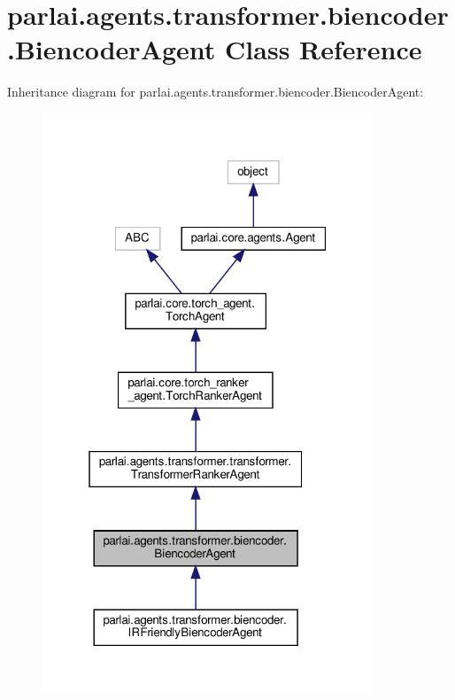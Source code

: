 \hypertarget{classparlai_1_1agents_1_1transformer_1_1biencoder_1_1BiencoderAgent}{}\section{parlai.\+agents.\+transformer.\+biencoder.\+Biencoder\+Agent Class Reference}
\label{classparlai_1_1agents_1_1transformer_1_1biencoder_1_1BiencoderAgent}


Inheritance diagram for parlai.\+agents.\+transformer.\+biencoder.\+Biencoder\+Agent\+:
\nopagebreak
\begin{figure}[H]
\begin{center}
\leavevmode
\includegraphics[width=280pt]{d8/d7c/classparlai_1_1agents_1_1transformer_1_1biencoder_1_1BiencoderAgent__inherit__graph}
\end{center}
\end{figure}


